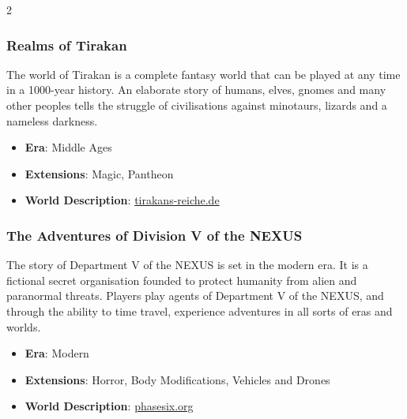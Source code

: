 \begin{multicols}{2}
{\subsubsection{Realms of Tirakan} 

The world of Tirakan is a complete fantasy world that can be played at any time in a 1000-year history. An elaborate story of humans, elves, gnomes and many other peoples tells the struggle of civilisations against minotaurs, lizards and a nameless darkness.
\begin{itemize}
    \item \textbf{Era}: Middle Ages 
    \item \textbf{Extensions}: Magic, Pantheon 
    \item \textbf{World Description}: \href{https://tirakans-reiche.de}{tirakans-reiche.de} 
\end{itemize}

\subsubsection{The Adventures of Division V of the NEXUS} 

The story of Department V of the NEXUS is set in the modern era. It is a fictional secret organisation founded to protect humanity from alien and paranormal threats. Players play agents of Department V of the NEXUS, and through the ability to time travel, experience adventures in all sorts of eras and worlds.
\begin{itemize}
    \item \textbf{Era}: Modern 
    \item \textbf{Extensions}: Horror, Body Modifications, Vehicles and Drones 
    \item \textbf{World Description}: \href{https://phasesix.org/world/nexus}{phasesix.org} 
\end{itemize}
}{}
\end{multicols}
